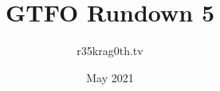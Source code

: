 \documentclass[11pt,a4paper]{article}
\begin{document}
\title{GTFO Rundown 5}
\author{r35krag0th.tv}
\date{May 2021}
\maketitle
\pagebreak

\tableofcontents

\pagebreak









\end{document}
